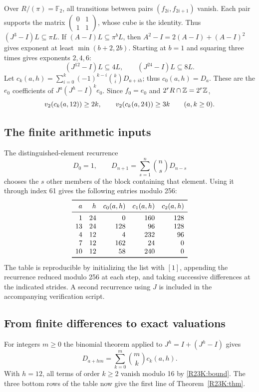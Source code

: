\documentclass[11pt,a4paper]{article}
\begin{document}
Over $R/(\pi)=\mathbb F_2$, all transitions between pairs
$(f_{2i},f_{2i+1})$ vanish. Each pair supports the matrix
$\left(\begin{smallmatrix}0&1\\1&1\end{smallmatrix}\right)$, whose cube
is the identity. Thus $(J^3-I)L\subseteq\pi L$. If
$(A-I)L\subseteq \pi^b L$, then
$A^2-I=2(A-I)+(A-I)^2$ gives exponent at least
$\min(b+2,2b)$. Starting at $b=1$ and squaring three times gives
exponents $2,4,6$:
\[
 (J^{12}-I)L\subseteq4L,\qquad (J^{24}-I)L\subseteq8L.
\]
Let $c_k(a,h)=\sum_{i=0}^k(-1)^{k-i}\binom ki D_{a+ih}$; thus
$c_0(a,h)=D_a$. These are the $e_0$ coefficients of
$J^a(J^h-I)^k e_0$. Since $f_0=e_0$ and $2^rR\cap\mathbb Z=2^r\mathbb Z$,
\begin{equation}\label{R23K:bound}
 v_2(c_k(a,12))\ge 2k,\qquad v_2(c_k(a,24))\ge 3k
 \qquad(a,k\ge0).
\end{equation}

\subsection*{The finite arithmetic inputs}
The distinguished-element recurrence
\[
 D_0=1,\qquad D_{n+1}=\sum_{s=1}^n\binom nsD_{n-s}
\]
chooses the $s$ other members of the block containing that element.
Using it through index 61 gives the following entries modulo 256:
\[
\begin{array}{rrrrr}\toprule
 a&h&c_0(a,h)&c_1(a,h)&c_2(a,h)\\ \midrule
 1&24&0&160&128\\
 13&24&128&96&128\\
 4&12&4&232&96\\
 7&12&162&24&0\\
 10&12&58&240&0\\ \bottomrule
\end{array}
\]
The table is reproducible by initializing the list with $[1]$,
appending the recurrence reduced modulo 256 at each step, and taking
successive differences at the indicated strides. A second recurrence
using $J$ is included in the accompanying verification script.


\subsection*{From finite differences to exact valuations}
For integers $m\ge0$ the binomial theorem applied to $J^h=I+(J^h-I)$ gives
\[
 D_{a+hm}=\sum_{k=0}^m\binom mk c_k(a,h).
\]
With $h=12$, all terms of order $k\ge2$ vanish modulo 16 by
\eqref{R23K:bound}. The three bottom rows of the table now give the
first line of Theorem~\ref{R23K:thm}.
\end{document}
